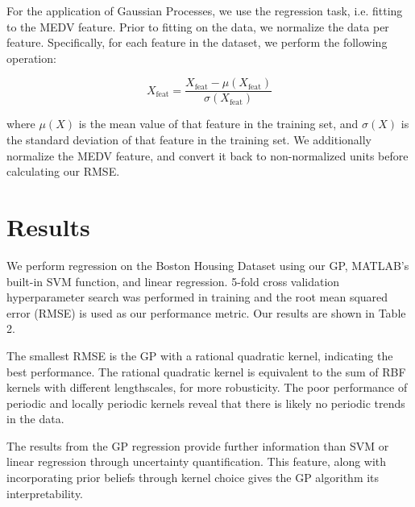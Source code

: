 \documentclass{article}
\begin{document}
For the application of Gaussian Processes, we use the regression task, i.e. fitting to the MEDV feature. Prior to
fitting on the data, we normalize the data per feature. Specifically, for each feature in the dataset, we perform the
following operation:

\[
  X_{\text{feat}} = \frac{X_{\text{feat}} - \mu(X_{\text{feat}})}{\sigma(X_{\text{feat}})}
\]

where $\mu(X)$ is the mean value of that feature in the training set, and $\sigma(X)$ is the standard deviation of that
feature in the training set. We additionally normalize the MEDV feature, and convert it back to non-normalized units
before calculating our RMSE.

\section{Results}
We perform regression on the Boston Housing Dataset using our GP, MATLAB's built-in SVM function, and linear regression. 5-fold cross validation hyperparameter search was performed in training and the root mean squared error (RMSE) is used as our performance metric. Our results are shown in Table 2.

The smallest RMSE is the GP with a rational quadratic kernel, indicating the best performance. The rational quadratic kernel is equivalent to the sum of RBF kernels with different lengthscales, for more robusticity. The poor performance of periodic and locally periodic kernels reveal that there is likely no periodic trends in the data.

The results from the GP regression provide further information than SVM or linear regression through uncertainty quantification. This feature, along with incorporating prior beliefs through kernel choice gives the GP algorithm its interpretability.

\begin{table}[!hp]\label{table:results}
\centering
\caption{Table of Boston Housing Dataset feature names and features}
\end{table}
\end{document}
